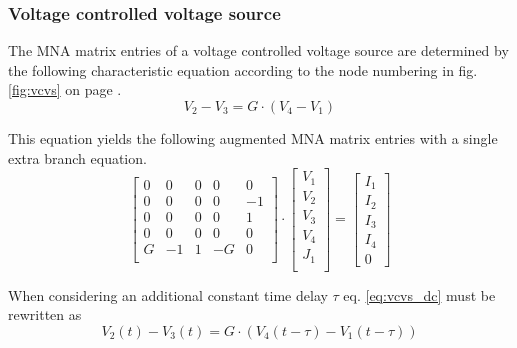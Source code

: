 \subsubsection{Voltage controlled voltage source}

The MNA matrix entries of a voltage controlled voltage source are
determined by the following characteristic equation according to the
node numbering in fig. \ref{fig:vcvs} on page \pageref{fig:vcvs}.
\begin{equation}
\label{eq:vcvs_dc}
V_2 - V_3 = G\cdot\left(V_4 - V_1\right)
\end{equation}

This equation yields the following augmented MNA matrix entries with a
single extra branch equation.
\begin{equation}
\begin{bmatrix}
0 & 0 & 0 & 0 & 0\\
0 & 0 & 0 & 0 & -1\\
0 & 0 & 0 & 0 & 1\\
0 & 0 & 0 & 0 & 0\\
G & -1 & 1 & -G & 0\\
\end{bmatrix}
\cdot
\begin{bmatrix}
V_1\\
V_2\\
V_3\\
V_4\\
J_1\\
\end{bmatrix}
=
\begin{bmatrix}
I_1\\
I_2\\
I_3\\
I_4\\
0
\end{bmatrix}
\end{equation}

When considering an additional constant time delay $\tau$
eq. \eqref{eq:vcvs_dc} must be rewritten as
\begin{equation}
\label{eq:vcvs_delay}
V_2\left(t\right) - V_3\left(t\right) = G\cdot\left(V_4\left(t - \tau\right) - V_1\left(t - \tau\right)\right)
\end{equation}

